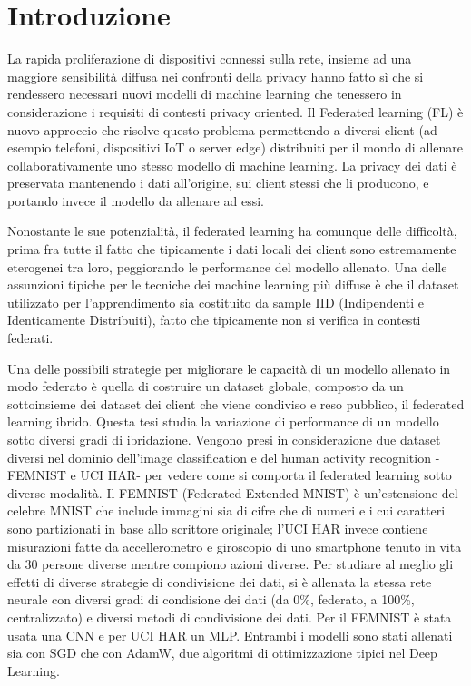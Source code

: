 \chapter{Introduzione}
La rapida proliferazione di dispositivi connessi sulla rete, insieme 
ad una maggiore sensibilità diffusa nei confronti della privacy 
hanno fatto sì che si rendessero necessari nuovi modelli di machine 
learning che tenessero in considerazione i requisiti di contesti 
privacy oriented. Il Federated learning (FL) è nuovo approccio che 
risolve questo problema permettendo a diversi client (ad esempio
telefoni, dispositivi IoT o server edge) distribuiti per il mondo di 
allenare collaborativamente uno stesso modello di machine learning. La 
privacy dei dati è preservata mantenendo i dati all'origine, sui 
client stessi che li producono, e portando invece il modello da 
allenare ad essi.

Nonostante le sue potenzialità, il federated learning ha comunque delle
difficoltà, prima fra tutte il fatto che tipicamente i dati locali 
dei client sono estremamente eterogenei tra loro, peggiorando le 
performance del modello allenato. Una delle assunzioni tipiche per le 
tecniche dei machine learning più diffuse è che il dataset utilizzato 
per l'apprendimento sia costituito da sample IID (Indipendenti e 
Identicamente Distribuiti), fatto che tipicamente non si verifica in 
contesti federati.

Una delle possibili strategie per migliorare le capacità di un modello 
allenato in modo federato è quella di costruire un dataset globale, 
composto da un sottoinsieme dei dataset dei client che viene condiviso 
e reso pubblico, il federated learning ibrido. Questa tesi studia la 
variazione di performance di un modello sotto diversi gradi di 
ibridazione. Vengono presi in considerazione due dataset diversi nel 
dominio dell'image classification e del human activity recognition 
-FEMNIST e UCI HAR- per vedere come si comporta il federated 
learning sotto diverse modalità. Il FEMNIST (Federated Extended MNIST)
è un'estensione del celebre MNIST che include immagini sia di cifre 
che di numeri e i cui caratteri sono partizionati in base allo scrittore
originale; l'UCI HAR invece contiene misurazioni fatte 
da accellerometro e giroscopio di uno smartphone tenuto in vita da 30
persone diverse mentre compiono azioni diverse. Per studiare al meglio 
gli effetti di diverse strategie di condivisione dei dati, si è 
allenata la stessa rete neurale con diversi gradi di condisione dei 
dati (da 0\%, federato, a 100\%, centralizzato) e diversi metodi di 
condivisione dei dati. Per il FEMNIST è stata usata una CNN e per UCI 
HAR un MLP. Entrambi i modelli sono stati allenati sia con SGD che 
con AdamW, due algoritmi di ottimizzazione tipici nel Deep Learning.


